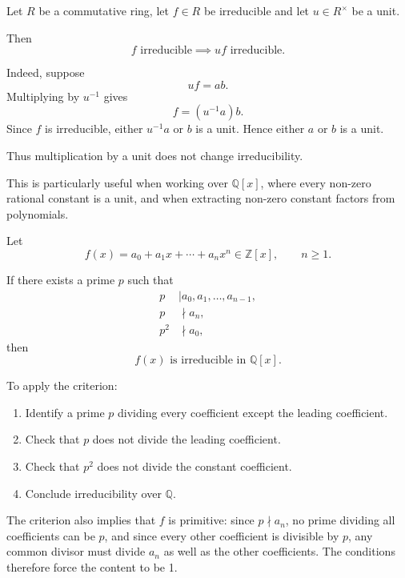 \begin{method}
Let \(R\) be a commutative ring, let \(f\in R\) be irreducible and let \(u\in R^\times\) be a unit.

Then
\[
\boxed{f\text{ irreducible}\implies uf\text{ irreducible}.}
\]

Indeed, suppose
\[
uf=ab.
\]
Multiplying by \(u^{-1}\) gives
\[
f=(u^{-1}a)b.
\]
Since \(f\) is irreducible, either \(u^{-1}a\) or \(b\) is a unit. Hence either \(a\) or \(b\) is a unit.

Thus multiplication by a unit does not change irreducibility.

This is particularly useful when working over \(\mathbb{Q}[x]\), where every non-zero rational constant is a unit, and when extracting non-zero constant factors from polynomials.
\end{method}

\begin{method}
Let
\[
f(x)=a_0+a_1x+\cdots+a_nx^n\in\mathbb{Z}[x],
\qquad n\geq 1.
\]

If there exists a prime \(p\) such that
\[
\begin{aligned}
p&\mid a_0,a_1,\ldots,a_{n-1},\\
p&\nmid a_n,\\
p^2&\nmid a_0,
\end{aligned}
\]
then
\[
\boxed{f(x)\text{ is irreducible in }\mathbb{Q}[x].}
\]

To apply the criterion:

\begin{enumerate}
    \item Identify a prime \(p\) dividing every coefficient except the leading coefficient.
    \item Check that \(p\) does not divide the leading coefficient.
    \item Check that \(p^2\) does not divide the constant coefficient.
    \item Conclude irreducibility over \(\mathbb{Q}\).
\end{enumerate}

The criterion also implies that \(f\) is primitive: since \(p\nmid a_n\), no prime dividing all coefficients can be \(p\), and since every other coefficient is divisible by \(p\), any common divisor must divide \(a_n\) as well as the other coefficients. The conditions therefore force the content to be 1.

\end{method}

